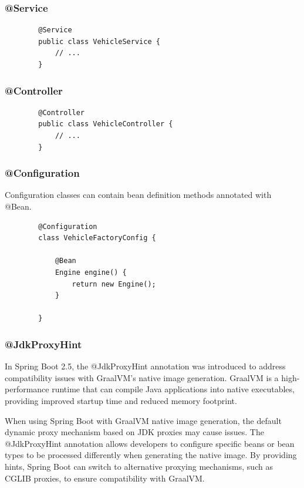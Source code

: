 \documentclass{scrartcl}
\begin{document}
\subsubsection{@Service}

    \begin{lstlisting}
        @Service
        public class VehicleService {
            // ...
        }
    \end{lstlisting}

\subsubsection{@Controller}

    \begin{lstlisting}
        @Controller
        public class VehicleController {
            // ...
        }
    \end{lstlisting}

\subsubsection{@Configuration}

    Configuration classes can contain bean definition methods annotated with @Bean.

    \begin{lstlisting}
        @Configuration
        class VehicleFactoryConfig {

            @Bean
            Engine engine() {
                return new Engine();
            }

        }
    \end{lstlisting}

\subsubsection{@JdkProxyHint}

In Spring Boot 2.5, the @JdkProxyHint annotation was introduced to address compatibility issues with GraalVM's native image generation. GraalVM is a high-performance runtime that can compile Java applications into native executables, providing improved startup time and reduced memory footprint.

When using Spring Boot with GraalVM native image generation, the default dynamic proxy mechanism based on JDK proxies may cause issues. The @JdkProxyHint annotation allows developers to configure specific beans or bean types to be processed differently when generating the native image. By providing hints, Spring Boot can switch to alternative proxying mechanisms, such as CGLIB proxies, to ensure compatibility with GraalVM.
\end{document}
